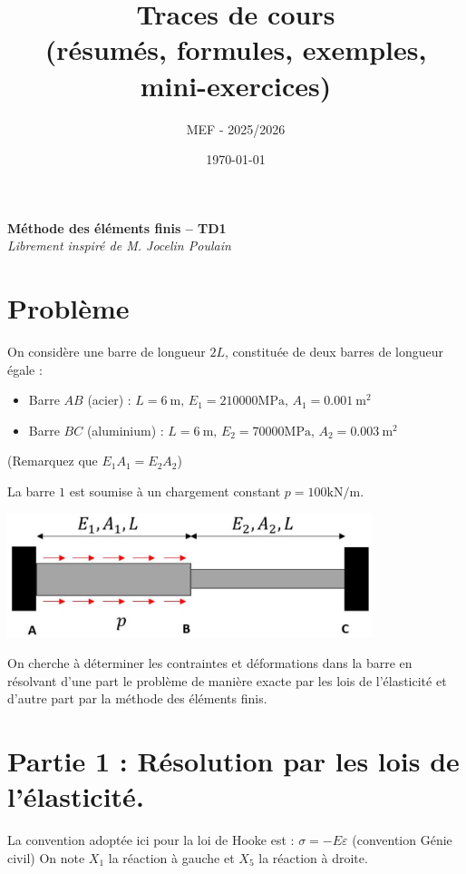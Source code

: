 \documentclass[11pt,a4paper]{report}
\title{\textbf{Traces de cours}\\\large (résumés, formules, exemples, mini-exercices)}
\author{ MEF - 2025/2026 }
\date{\today}
\begin{document}
\begin{center}
    {\LARGE \textbf{Méthode des éléments finis -- TD1}}\\[1em]
    {\large \textit{Librement inspiré de M. Jocelin Poulain}}
\end{center}
\captionsetup{singlelinecheck=false}
\section*{Problème}
On considère une barre de longueur $2 L$, constituée de deux barres de longueur égale :

\begin{itemize}
  \item Barre $AB$ (acier) : $L=6 \mathrm{~m}, \, E_{1}=210000 \mathrm{MPa},\,  A_{1}=0.001 \mathrm{~m}^{2}$
  \item Barre $BC$ (aluminium) : $L=6 \mathrm{~m}, \, E_{2}=70000 \mathrm{MPa},\, A_{2}=0.003 \mathrm{~m}^{2}$
\end{itemize}

(Remarquez que $E_1A_1 = E_2A_2$)

La barre $1$ est soumise à un chargement constant $p=100 \mathrm{kN} / \mathrm{m}$.

\begin{center}
\includegraphics[max width=0.8\textwidth, center]{2025_10_03_26e11264345fd9bad5cag-1(2)}
\end{center}

On cherche à déterminer les contraintes et déformations dans la barre en résolvant d'une part le problème de manière exacte par les lois de l'élasticité et d'autre part par la méthode des éléments finis.

\section*{Partie 1 : Résolution par les lois de l'élasticité.}
La convention adoptée ici pour la loi de Hooke est : $\sigma=-E \varepsilon$ (convention Génie civil) On note $X_{1}$ la réaction à gauche et $X_{5}$ la réaction à droite.
\end{document}
